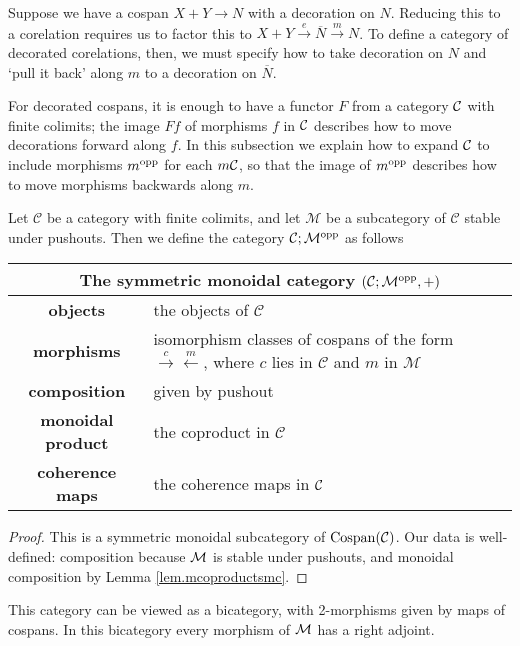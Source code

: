 Suppose we have a cospan $X+Y \to N$ with a decoration on $N$. Reducing this to
a corelation requires us to factor this to $X+Y \stackrel{e}\to \overline{N}
\stackrel{m}\to N$. To define a category of decorated corelations, then, we must
specify how to take decoration on $N$ and `pull it back' along $m$ to a decoration on
$\overline{N}$.

For decorated cospans, it is enough to have a functor $F$ from a category $\mathcal C$
with finite colimits; the image $Ff$ of morphisms $f$ in $\mathcal C$ describes how
to move decorations forward along $f$. In this subsection we explain how to
expand $\mathcal C$ to include morphisms $m^{\mathrm{opp}}$ for each $m \mathcal C$, so that the
image of $m^{\mathrm{opp}}$ describes how to move morphisms backwards along $m$.

\begin{proposition}
  Let $\mathcal C$ be a category with finite colimits, and let $\mathcal M$ be a
  subcategory of $\mathcal C$ stable under pushouts. Then we define the category
  $\mathcal C; \mathcal M^{\mathrm{opp}}$ as follows  
  \begin{center}
    \begin{tabular}{| c | p{} |}
      \hline
      \multicolumn{2}{|c|}{The symmetric monoidal category $(\mathcal C;\mathcal M^{\mathrm{opp}},+)$} \\
      \hline
      \textbf{objects} & the objects of $\mathcal C$ \\ 
      \textbf{morphisms} & isomorphism classes of cospans of the form
      $\stackrel{c}\rightarrow \stackrel{m}\leftarrow$, where $c$ lies in
      $\mathcal C$ and $m$ in $\mathcal M$\\ 
      \textbf{composition} & given by pushout \\
      \textbf{monoidal product} & the coproduct in $\mathcal C$ \\
      \textbf{coherence maps} & the coherence maps in $\mathcal C$ \\
      \hline
    \end{tabular}
  \end{center}
\end{proposition}
\begin{proof}
  This is a symmetric monoidal subcategory of $\operatorname{{Cospan}}(\mathcal C)$. Our data is
  well-defined: composition because $\mathcal M$ is stable under pushouts, and
  monoidal composition by Lemma \ref{lem.mcoproductsmc}. 
\end{proof}

This category can be viewed as a bicategory, with 2-morphisms given by maps of
cospans. In this bicategory every morphism of $\mathcal M$ has a right adjoint.

